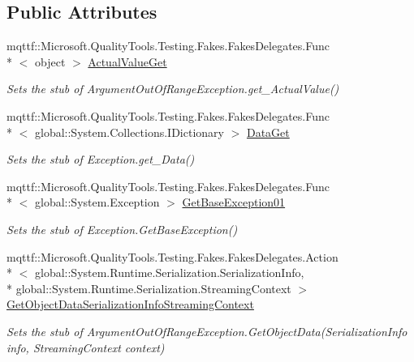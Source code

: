 \subsection*{Public Attributes}
\begin{DoxyCompactItemize}
\item 
mqttf\-::\-Microsoft.\-Quality\-Tools.\-Testing.\-Fakes.\-Fakes\-Delegates.\-Func\\*
$<$ object $>$ \hyperlink{class_system_1_1_fakes_1_1_stub_argument_out_of_range_exception_a63f72ab878d5f58bd91e161c441c0bdb}{Actual\-Value\-Get}
\begin{DoxyCompactList}\small\item\em Sets the stub of Argument\-Out\-Of\-Range\-Exception.\-get\-\_\-\-Actual\-Value()\end{DoxyCompactList}\item 
mqttf\-::\-Microsoft.\-Quality\-Tools.\-Testing.\-Fakes.\-Fakes\-Delegates.\-Func\\*
$<$ global\-::\-System.\-Collections.\-I\-Dictionary $>$ \hyperlink{class_system_1_1_fakes_1_1_stub_argument_out_of_range_exception_a84982b1ab980eeba9345140b37438209}{Data\-Get}
\begin{DoxyCompactList}\small\item\em Sets the stub of Exception.\-get\-\_\-\-Data()\end{DoxyCompactList}\item 
mqttf\-::\-Microsoft.\-Quality\-Tools.\-Testing.\-Fakes.\-Fakes\-Delegates.\-Func\\*
$<$ global\-::\-System.\-Exception $>$ \hyperlink{class_system_1_1_fakes_1_1_stub_argument_out_of_range_exception_a43d17b1e584cf66d37d591f5a75a8bd6}{Get\-Base\-Exception01}
\begin{DoxyCompactList}\small\item\em Sets the stub of Exception.\-Get\-Base\-Exception()\end{DoxyCompactList}\item 
mqttf\-::\-Microsoft.\-Quality\-Tools.\-Testing.\-Fakes.\-Fakes\-Delegates.\-Action\\*
$<$ global\-::\-System.\-Runtime.\-Serialization.\-Serialization\-Info, \\*
global\-::\-System.\-Runtime.\-Serialization.\-Streaming\-Context $>$ \hyperlink{class_system_1_1_fakes_1_1_stub_argument_out_of_range_exception_a6e27da5537e2f58e2ad4719c8a636612}{Get\-Object\-Data\-Serialization\-Info\-Streaming\-Context}
\begin{DoxyCompactList}\small\item\em Sets the stub of Argument\-Out\-Of\-Range\-Exception.\-Get\-Object\-Data(\-Serialization\-Info info, Streaming\-Context context)\end{DoxyCompactList}\item 

\end{DoxyCompactItemize}

